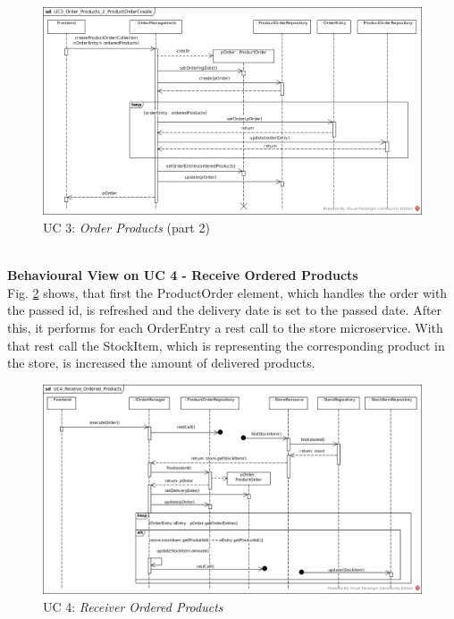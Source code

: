 			\begin{figure}[!h]
				\centering
				\includegraphics[width = 1\textwidth]{img/UC3_Order_Products_2_ProductOrderCreate.jpg}
				\caption{UC 3: \textit{Order Products} (part 2)}
				\label{MS_UC3_2}
			\end{figure}
		\noindent
		\\
		\textbf{Behavioural View on UC 4 - Receive Ordered Products} \\
		Fig. \ref{MS_UC4} shows, that first the ProductOrder element, which handles the order with the passed id, is refreshed and the delivery date is set to the passed date.
		After this, it performs for each OrderEntry a rest call to the store microservice. With that rest call the StockItem, which is representing the corresponding product in the store, is increased the amount of delivered products.		
			
			\begin{figure}[!h]
				\centering
				\includegraphics[width = 1\textwidth]{img/UC4_Receive_Ordered_Products.jpg}
				\caption{UC 4: \textit{Receiver Ordered Products} }
				\label{MS_UC4}
			\end{figure}
			
